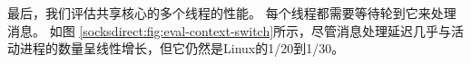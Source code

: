 最后，我们评估共享核心的多个线程的性能。 每个线程都需要等待轮到它来处理消息。
如图 \ref {socksdirect:fig:eval-context-switch}所示，尽管消息处理延迟几乎与活动进程的数量呈线性增长，但它仍然是Linux的1/20到1/30。




